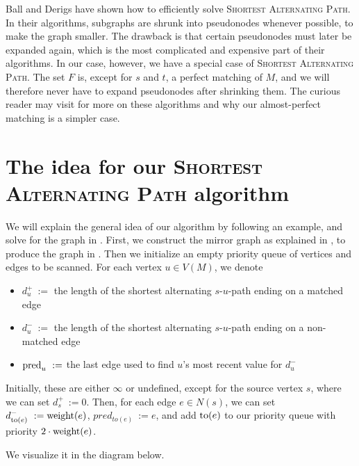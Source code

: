Ball and Derigs \cite{source:shortest_alternating_path} have shown how to efficiently solve \textsc{Shortest Alternating Path}. In their algorithms, subgraphs are shrunk into pseudonodes whenever possible, to make the graph smaller. The drawback is that certain pseudonodes must later be expanded again, which is the most complicated and expensive part of their algorithms. In our case, however, we have a special case of \textsc{Shortest Alternating Path}. The set $F$ is, except for $s$ and $t$, a perfect matching of $M$, and we will therefore never have to expand pseudonodes after shrinking them. The curious reader may visit \cite{source:shortest_alternating_path} for more on these algorithms and why our almost-perfect matching is a simpler case.

\section{The idea for our \textsc{Shortest Alternating Path} algorithm}
We will explain the general idea of our algorithm by following an example, and solve for the graph in . First, we construct the mirror graph as explained in , to produce the graph in . Then we initialize an empty priority queue of vertices and edges to be scanned. For each vertex $u \in V(M)$, we denote
\begin{itemize}
    \item $d^+_u~:=$ the length of the shortest alternating $s$-$u$-path ending on a matched edge
    \item $d^-_u~:=$ the length of the shortest alternating $s$-$u$-path ending on a non-matched edge
    \item $\operatorname{pred}_u~:=$ the last edge used to find $u$'s most recent value for $d^-_u$
\end{itemize}

Initially, these are either $\infty$ or undefined, except for the source vertex $s$, where we can set $d^+_s~:= 0$. Then, for each edge $e \in N(s)$, we can set $d^-_{\operatorname{to}(e)}~:= \operatorname{weight}(e)$, $pred_{to(e)}~:= e$, and add $\operatorname{to}(e)$ to our priority queue with priority $2 \cdot \operatorname{weight}(e)$.

We visualize it in the diagram below.

